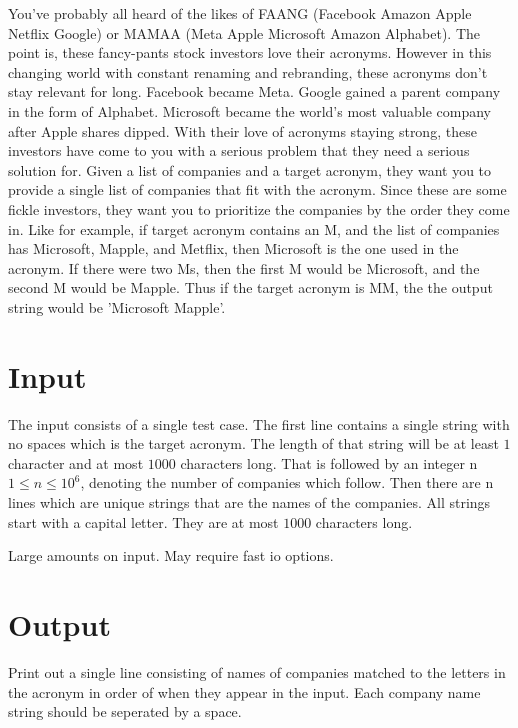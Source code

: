 
You've probably all heard of the likes of FAANG (Facebook Amazon Apple Netflix Google) or MAMAA (Meta Apple Microsoft Amazon Alphabet). The point is, these fancy-pants stock investors love their acronyms. However in this changing world with constant renaming and rebranding, these acronyms don't stay relevant for long. Facebook became Meta. Google gained a parent company in the form of Alphabet. Microsoft became the world's most valuable company after Apple shares dipped. With their love of acronyms staying strong, these investors have come to you with a serious problem that they need a serious solution for. Given a list of companies and a target acronym, they want you to provide a single list of companies that fit with the acronym. Since these are some fickle investors, they want you to prioritize the companies by the order they come in. Like for example, if target acronym contains an M, and the list of companies has Microsoft, Mapple, and Metflix, then Microsoft is the one used in the acronym. If there were two Ms, then the first M would be Microsoft, and the second M would be Mapple. Thus if the target acronym is MM, the the output string would be 'Microsoft Mapple'.

\section*{Input}

The input consists of a single test case. The first line contains a single string with no spaces which is the target acronym. The length of that string will be at least $1$ character and at most $1000$ characters long. That is followed by an integer n $1 \le n \le 10^{6}$, denoting the number of companies which follow. Then there are n lines which are unique strings that are the names of the companies. All strings start with a capital letter. They are at most $1000$ characters long.

Large amounts on input. May require fast io options.

\section*{Output}

Print out a single line consisting of names of companies matched to the letters in the acronym in order of when they appear in the input. Each company name string should be seperated by a space.
